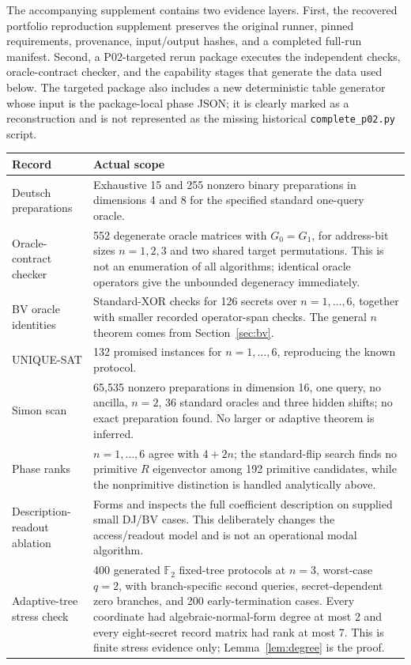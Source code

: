 \documentclass[11pt]{article}
\newcommand{\F}{\mathbb F}
\begin{document}
The accompanying supplement contains two evidence layers. First, the recovered portfolio reproduction supplement preserves the original runner, pinned requirements, provenance, input/output hashes, and a completed full-run manifest. Second, a P02-targeted rerun package executes the independent checks, oracle-contract checker, and the capability stages that generate the data used below. The targeted package also includes a new deterministic table generator whose input is the package-local phase JSON; it is clearly marked as a reconstruction and is not represented as the missing historical \texttt{complete\_p02.py} script.

\begin{center}\small
\begin{tabular}{@{}L{.28\linewidth}L{.62\linewidth}@{}}
\toprule
Record & Actual scope\\\midrule
Deutsch preparations & Exhaustive 15 and 255 nonzero binary preparations in dimensions 4 and 8 for the specified standard one-query oracle.\\
Oracle-contract checker & 552 degenerate oracle matrices with $G_0=G_1$, for address-bit sizes $n=1,2,3$ and two shared target permutations. This is not an enumeration of all algorithms; identical oracle operators give the unbounded degeneracy immediately.\\
BV oracle identities & Standard-XOR checks for 126 secrets over $n=1,\ldots,6$, together with smaller recorded operator-span checks. The general $n$ theorem comes from Section~\ref{sec:bv}.\\
UNIQUE-SAT & 132 promised instances for $n=1,\ldots,6$, reproducing the known protocol.\\
Simon scan & 65,535 nonzero preparations in dimension 16, one query, no ancilla, $n=2$, 36 standard oracles and three hidden shifts; no exact preparation found. No larger or adaptive theorem is inferred.\\
Phase ranks & $n=1,\ldots,6$ agree with $4+2n$; the standard-flip search finds no primitive $R$ eigenvector among 192 primitive candidates, while the nonprimitive distinction is handled analytically above.\\
Description-readout ablation & Forms and inspects the full coefficient description on supplied small DJ/BV cases. This deliberately changes the access/readout model and is not an operational modal algorithm.\\
Adaptive-tree stress check & 400 generated $\F_2$ fixed-tree protocols at $n=3$, worst-case $q=2$, with branch-specific second queries, secret-dependent zero branches, and 200 early-termination cases. Every coordinate had algebraic-normal-form degree at most 2 and every eight-secret record matrix had rank at most 7. This is finite stress evidence only; Lemma~\ref{lem:degree} is the proof.\\\bottomrule
\end{tabular}
\end{center}
\end{document}

